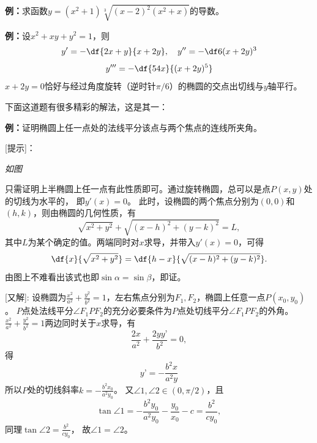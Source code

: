 {\bf 例：}求函数$y=(x^2+1)\sqrt[3]{(x-2)^2(x^2+x)}$的导数。

{\bf 例：}设$x^2+xy+y^2=1$，则
$$y'=-\df{2x+y}{x+2y},\quad y''=-\df6{(x+2y)^3}$$
$$y'''=-\df{54x}{(x+2y)^5}$$
$x+2y=0$恰好与经过角度旋转（逆时针$\pi/6$）的椭圆的交点出切线与$y$轴平行。

\begin{shaded}
	下面这道题有很多精彩的解法，这是其一：
	
	{\bf 例：}证明椭圆上任一点处的法线平分该点与两个焦点的连线所夹角。

	[提示]：{\it 如图
	\begin{center}
	\end{center}
	只需证明上半椭圆上任一点有此性质即可。通过旋转椭圆，总可以是点$P(x,y)$处的切线为水平的，
	即$y'(x)=0$。
	此时，设椭圆的两个焦点分别为$(0,0)$和$(h,k)$，则由椭圆的几何性质，有
	$$\sqrt{x^2+y^2}+\sqrt{(x-h)^2+(y-k)^2}=L,$$
	其中$L$为某个确定的值。两端同时对$x$求导，并带入$y'(x)=0$，可得
	$$\df{x}{\sqrt{x^2+y^2}}=\df{h-x}{\sqrt{(x-h)^2+(y-k)^2}}.$$
	由图上不难看出该式也即$\sin\alpha=\sin\beta$，即证。}
		
[又解]:
设椭圆为$\frac{x^2}{a^2}+\frac{y^2}{b^2}=1$，左右焦点分别为$F_1,F_2$，椭圆上任意一点$P(x_0,y_0)$。
$P$点处法线平分$\angle F_1PF_2$的充分必要条件为$P$点处切线平分$\angle F_1PF_2$的外角。
$\frac{x^2}{a^2}+\frac{y^2}{b^2}=1$两边同时关于$x$求导，有
$$\frac{2x}{a^2}+\frac{2yy’}{b^2}=0,$$
得
$$y’=-\frac{b^2x}{a^2y}$$
所以$P$处的切线斜率$k=-\frac{b^2x_0}{a^2y_0}$。
又$\angle 1,\angle 2\in(0,\pi/2)$，且
$$\tan\angle 1=-\frac{b^2y_0}{a^2y_0}-\frac{y_0}{x_0}-c=\frac{b^2}{cy_0},$$
同理$\tan\angle 2= \frac{b^2}{cy_0}$，
故$\angle 1=\angle 2$。

\end{shaded}

